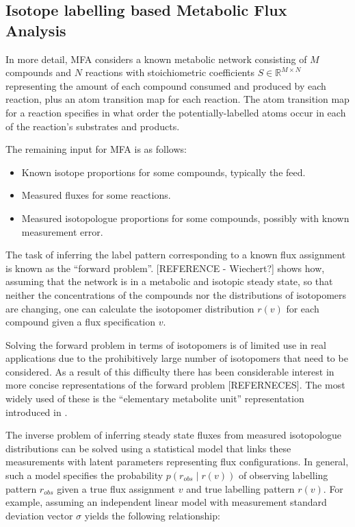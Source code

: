 \documentclass{article}
\begin{document}
\subsection{Isotope labelling based Metabolic Flux
Analysis}\label{isotope-labelling-based-metabolic-flux-analysis}

In more detail, MFA considers a known metabolic network consisting of
\(M\) compounds and \(N\) reactions with stoichiometric coefficients
\(S\in\mathbb{R}^{M\times N}\) representing the amount of each compound
consumed and produced by each reaction, plus an atom transition map for
each reaction. The atom transition map for a reaction specifies in what
order the potentially-labelled atoms occur in each of the reaction's
substrates and products.

The remaining input for MFA is as follows:

\begin{itemize}
\item
  Known isotope proportions for some compounds, typically the feed.
\item
  Measured fluxes for some reactions.
\item
  Measured isotopologue proportions for some compounds, possibly with
  known measurement error.
\end{itemize}

The task of inferring the label pattern corresponding to a known flux
assignment is known as the ``forward problem''. {[}REFERENCE -
Wiechert?{]} shows how, assuming that the network is in a metabolic and
isotopic steady state, so that neither the concentrations of the
compounds nor the distributions of isotopomers are changing, one can
calculate the isotopomer distribution \(r(v)\) for each compound given a
flux specification \(v\).

Solving the forward problem in terms of isotopomers is of limited use in
real applications due to the prohibitively large number of isotopomers
that need to be considered. As a result of this difficulty there has
been considerable interest in more concise representations of the
forward problem {[}REFERNECES{]}. The most widely used of these is the
``elementary metabolite unit'' representation introduced in
\citep{antoniewiczElementaryMetaboliteUnits2007}.

The inverse problem of inferring steady state fluxes from measured
isotopologue distributions can be solved using a statistical model that
links these measurements with latent parameters representing flux
configurations. In general, such a model specifies the probability
\(p(r_{obs}\mid r(v))\) of observing labelling pattern \(r_{obs}\) given
a true flux assignment \(v\) and true labelling pattern \(r(v)\). For
example, assuming an independent linear model with measurement standard
deviation vector \(\sigma\) yields the following relationship:
\end{document}
